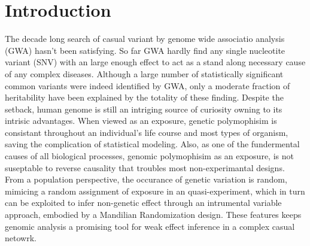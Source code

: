 \section{Introduction}
The decade long search of casual variant by genome wide associatio analysis (GWA) hasn't been satisfying. So far GWA hardly find any single nucleotite variant (SNV) with an large enough effect to act as a stand along necessary cause of any complex diseases. Although a large number of statistically significant common variants were indeed identified by GWA, only a moderate fraction of heritability have been explained by the totality of these finding\cite{GWA1, GWA2}. Despite the setback, human genome is still an intriging source of curiosity owning to its intrisic advantages. When viewed as an exposure, genetic polymophisim is consistant throughout an individual's life course and most types of organism, saving the complication of statistical modeling. Also, as one of the fundermental causes of all biological processes, genomic polymophisim as an exposure, is not suseptable to reverse causality that troubles most non-experimantal designs. From a population perspective, the occurance of genetic variation is random, mimicing a random assignment of exposure in an quasi-experiment, which in turn can be exploited to infer non-genetic effect through an intrumental variable approach, embodied by a Mandilian Randomization design\cite{MR1, MR2}. These features keeps genomic analysis a promising tool for weak effect inference in a complex casual netowrk.

